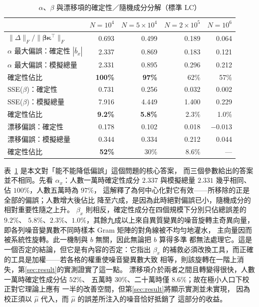\documentclass[UTF8, fontset=macnew, a4paper, 12pt]{ctexart}
\begin{document}
\begin{table}[H]
\centering
\caption{$\alpha$、$\beta$ 與漂移項的確定性／隨機成分分解（標準 LC）}
\small
\begin{tabular}{lrrrr}
\toprule
 & $N=10^4$ & $N=5\times10^4$ & $N=2\times10^5$ & $N=10^6$\\
\midrule
$\|\Delta\|_F/\|\boldsymbol\beta\boldsymbol\kappa^{\top}\|_F$
 & 0.693 & 0.499 & 0.189 & 0.064\\
\midrule
$\alpha$ 最大偏誤：確定性 $|\bar b_x|$ & 2.337 & 0.869 & 0.183 & 0.121\\
$\alpha$ 最大偏誤：模擬總量 & 2.331 & 0.895 & 0.296 & 0.212\\
\quad 確定性佔比 & \textbf{100\%} & \textbf{97\%} & 62\% & 57\%\\
\midrule
SSE($\beta$)：確定性 & 0.731 & 0.256 & 0.032 & 0.002\\
SSE($\beta$)：模擬總量 & 7.916 & 4.449 & 1.400 & 0.229\\
\quad 確定性佔比 & \textbf{9.2\%} & \textbf{5.8\%} & 2.3\% & 1.0\%\\
\midrule
漂移偏誤：確定性 & 0.178 & 0.102 & 0.018 & $-0.013$\\
漂移偏誤：模擬總量 & 0.344 & 0.334 & 0.212 & 0.044\\
\quad 確定性佔比 & \textbf{52\%} & 30\% & 8.6\% & ---\\
\bottomrule
\end{tabular}
\label{tab:betadec}
\end{table}

表~\ref{tab:betadec} 是本文對「能不能降低偏誤」這個問題的核心答案，
而三個參數給出的答案並不相同。先看 $\alpha_x$：人數一萬時確定性成分
$2.337$ 與模擬總量 $2.331$ 幾乎相同、佔 $100\%$，人數五萬時為 $97\%$，
這解釋了為何中心化對它有效——所移除的正是全部的偏誤；人數增大後佔比
降至六成，是因為此時絕對偏誤已小，隨機成分的相對重要性隨之上升。
$\beta_x$ 則相反，確定性成分在四個規模下分別只佔總誤差的 $9.2\%$、
$5.8\%$、$2.3\%$、$1.0\%$，其餘九成以上來自異質變異的噪音旋轉主奇異向量，
即各列噪音變異數不同時樣本 Gram 矩陣的對角線被不均勻地灌水，
主向量因而被系統性旋轉。此一機制與 $b$ 無關，因此無論把 $b$ 算得多準
都無法處理它。這是一個否定的結論，但它是有內容的否定：它指出 $\beta_x$
的補救必須改換工具，而正確的工具是加權——若各格的權重使噪音變異數大致
相等，則該旋轉在一階上消失，第\ref{sec:result}的實測證實了這一點。
漂移項介於兩者之間且轉變得很快，人數一萬時確定性成分佔 $52\%$、
五萬時 $30\%$、二十萬時僅 $8.6\%$；故在極小人口下校正對它理論上應有
一半的改善空間，但第\ref{sec:result}將顯示實測並未實現，
因為校正須以 $\hat\mu$ 代入，而 $\hat\mu$ 的誤差所注入的噪音恰好抵銷了
這部分的收益。
\end{document}
